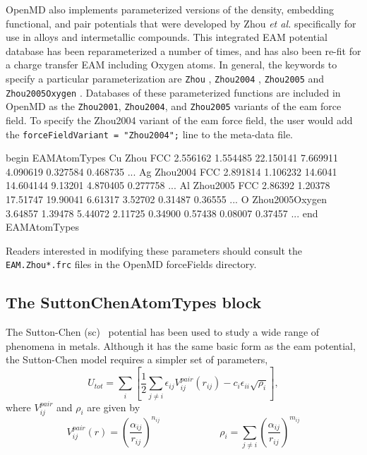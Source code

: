 \documentclass[]{book}
\begin{document}
{\sc OpenMD} also implements parameterized versions of the density,
embedding functional, and pair potentials that were developed by Zhou
\textit{et
  al.}\cite{Wadley:2001fk,Zhou:2001fj,Zhou:2004yq,Zhou:2005rt}
specifically for use in alloys and intermetallic compounds.  This
integrated EAM potential database has been reparameterized a number of
times,\cite{Wadley:2001fk,Zhou:2001fj,Zhou:2004yq} and has also been
re-fit for a charge transfer EAM including Oxygen
atoms.\cite{Zhou:2005rt} In general, the keywords to specify a
particular parameterization are \texttt{Zhou}
\cite{Wadley:2001fk,Zhou:2001fj}, \texttt{Zhou2004}
\cite{Zhou:2004yq}, \texttt{Zhou2005} and \texttt{Zhou2005Oxygen}
\cite{Zhou:2005rt}. Databases of these parameterized functions are
included in {\sc OpenMD} as the {\tt Zhou2001}, {\tt Zhou2004}, and
{\tt Zhou2005} variants of the {\sc eam} force field.  To specify the
Zhou2004 variant of the {\sc eam} force field, the user would add the
{\tt forceFieldVariant = "Zhou2004";} line to the meta-data file.

\begin{code}[caption={[An example of a EAMAtomTypes block using
parameterized functions.] A
more complicated example of a EAMAtomTypes block (each line is truncated).}, 
label={sch:EAMAtomTypes2}]
begin EAMAtomTypes
Cu Zhou FCC 2.556162 1.554485 22.150141 7.669911 4.090619 0.327584 0.468735 ...
Ag Zhou2004 FCC 2.891814 1.106232 14.6041   14.604144 9.13201  4.870405 0.277758 ...
Al Zhou2005 FCC 2.86392 1.20378 17.51747 19.90041 6.61317 3.52702 0.31487 0.36555 ...
O  Zhou2005Oxygen  3.64857 1.39478 5.44072 2.11725 0.34900 0.57438 0.08007 0.37457 ...
end EAMAtomTypes
\end{code}

Readers interested in modifying these parameters should consult the
\texttt{EAM.Zhou*.frc} files in the OpenMD forceFields directory.

\subsection{\label{section:ffSC}The SuttonChenAtomTypes block}

The Sutton-Chen ({\sc sc})~\cite{Chen90} potential has been used to
study a wide range of phenomena in metals.  Although it has the same
basic form as the {\sc eam} potential, the Sutton-Chen model requires
a simpler set of parameters,
\begin{equation}
\label{eq:SCP1}
U_{tot}=\sum _{i}\left[ \frac{1}{2}\sum _{j\neq
i}\epsilon_{ij}V^{pair}_{ij}(r_{ij})-c_{i}\epsilon_{ii}\sqrt{\rho_{i}}\right] ,
\end{equation}
 where $V^{pair}_{ij}$ and $\rho_{i}$ are given by 
\begin{equation}
\label{eq:SCP2}
V^{pair}_{ij}(r)=\left(
\frac{\alpha_{ij}}{r_{ij}}\right)^{n_{ij}} \hspace{1in} \rho_{i}=\sum_{j\neq i}\left(
\frac{\alpha_{ij}}{r_{ij}}\right) ^{m_{ij}}
\end{equation}
\end{document}
